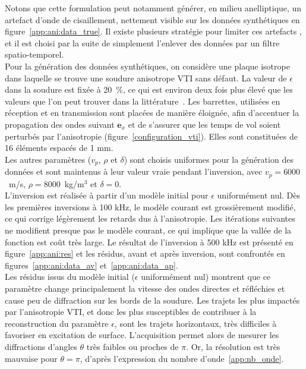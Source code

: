 Notons que cette formulation peut notamment générer, en milieu anelliptique, un artefact d'onde de cisaillement, nettement visible sur les données synthétiques en figure~\ref{app:ani:data_true}. Il existe plusieurs stratégie pour limiter ces artefacts \citep{duveneck}, et il est choisi par la suite de simplement l'enlever des données par un filtre spatio-temporel.\\






Pour la génération des données synthétiques, on considère une plaque isotrope dans laquelle se trouve une soudure anisotrope VTI sans défaut. La valeur de $\epsilon$ dans la soudure est fixée à 20~\%, ce qui est environ deux fois plus élevé que les valeurs que l'on peut trouver dans la littérature~\citep{chassignole}. 
Les barrettes, utilisées en réception et en transmission  sont placées de manière éloignée, afin d'accentuer la propagation des ondes suivant $\bm{e}_{x}$ et de s'assurer que les temps de vol soient perturbés par l'anisotropie (figure~\ref{configuration_vti}). Elles sont constituées de 16 éléments espacés de 1 mm.\\
Les autres paramètres ($v_{p}$, $\rho$ et $\delta$) sont choisis uniformes pour la génération des données et sont maintenus à leur valeur vraie pendant l'inversion, avec $v_{p}=6000$~m/s, $\rho=8000$~kg/m$^3$ et $\delta=0$.\\


L'inversion est réalisée à partir d'un modèle initial pour $\epsilon$ uniformément nul. Dès les premières inversions à 100 kHz, le modèle courant est grossièrement modifié, ce qui corrige légèrement les retards dus à l'anisotropie. Les itérations suivantes ne modifient presque pas le modèle courant, ce qui implique que la vallée de la fonction est coût très large. Le résultat de l'inversion à 500 kHz est présenté en figure~\ref{app:ani:res} et les résidus, avant et après inversion, sont confrontés en figures~\ref{app:ani:data_av} et~\ref{app:ani:data_ap}. \\


Les résidus issus du modèle initial ($\epsilon$ uniformément nul) montrent que ce paramètre change principalement la vitesse des ondes directes et réfléchies et cause peu de diffraction sur les bords de la soudure. Les trajets les plus impactés par l'anisotropie VTI, et donc les plus susceptibles de contribuer à la reconstruction du paramètre $\epsilon$, sont les trajets horizontaux, très difficiles à favoriser en excitation de surface. L'acquisition permet alors de mesurer les diffractions d'angles $\theta$ très faibles ou proches de $\pi$. Or, la résolution est très mauvaise pour $\theta=\pi$, d'après l'expression du nombre d'onde~\ref{app:nb_onde}.  

